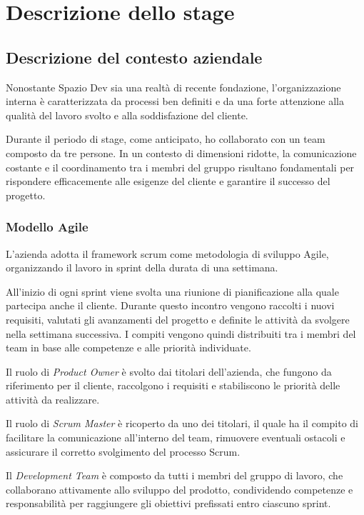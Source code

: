 \chapter{Descrizione dello stage}
\label{chap:descrizione-stage}

\section{Descrizione del contesto aziendale}

Nonostante Spazio Dev sia una realtà di recente fondazione, l'organizzazione interna è caratterizzata da processi ben definiti e da una forte attenzione alla qualità del lavoro svolto e alla soddisfazione del cliente.

Durante il periodo di stage, come anticipato, ho collaborato con un team composto da tre persone. In un contesto di dimensioni ridotte, la comunicazione costante e il coordinamento tra i membri del gruppo risultano fondamentali per rispondere efficacemente alle esigenze del cliente e garantire il successo del progetto.

\subsection{Modello Agile}

L'azienda adotta il framework \gls{scrum} come metodologia di sviluppo Agile, organizzando il lavoro in \gls{sprint} della durata di una settimana.

All'inizio di ogni sprint viene svolta una riunione di pianificazione alla quale partecipa anche il cliente. Durante questo incontro vengono raccolti i nuovi requisiti, valutati gli avanzamenti del progetto e definite le attività da svolgere nella settimana successiva. I compiti vengono quindi distribuiti tra i membri del team in base alle competenze e alle priorità individuate.

Il ruolo di \textit{Product Owner} è svolto dai titolari dell'azienda, che fungono da riferimento per il cliente, raccolgono i requisiti e stabiliscono le priorità delle attività da realizzare.

Il ruolo di \textit{Scrum Master} è ricoperto da uno dei titolari, il quale ha il compito di facilitare la comunicazione all'interno del team, rimuovere eventuali ostacoli e assicurare il corretto svolgimento del processo Scrum.

Il \textit{Development Team} è composto da tutti i membri del gruppo di lavoro, che collaborano attivamente allo sviluppo del prodotto, condividendo competenze e responsabilità per raggiungere gli obiettivi prefissati entro ciascuno sprint.

